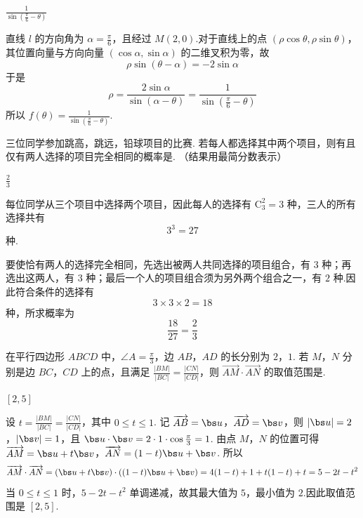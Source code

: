 \begin{answer}
\(\frac{1}{\sin\left(\frac{\pi}{6}-\theta\right)}\)
\end{answer}

\begin{solution}
直线 \(l\) 的方向角为 \(\alpha=\frac{\pi}{6}\)，且经过 \(M(2,0)\).对于直线上的点 \((\rho\cos\theta,\rho\sin\theta)\)，其位置向量与方向向量 \((\cos\alpha,\sin\alpha)\) 的二维叉积为零，故
\[
\rho\sin(\theta-\alpha)=-2\sin\alpha
\]
于是
\[
\rho=\frac{2\sin\alpha}{\sin(\alpha-\theta)}
=\frac{1}{\sin\left(\frac{\pi}{6}-\theta\right)}
\]
所以 \(f(\theta)=\frac{1}{\sin\left(\frac{\pi}{6}-\theta\right)}\).
\end{solution}

\begin{problem}
三位同学参加跳高，跳远，铅球项目的比赛. 若每人都选择其中两个项目，则有且仅有两人选择的项目完全相同的概率是\fillinblank{}. （结果用最简分数表示）
\end{problem}

\begin{answer}
\(\frac{2}{3}\)
\end{answer}

\begin{solution}
每位同学从三个项目中选择两个项目，因此每人的选择有 \(\mathrm C_3^2=3\) 种，三人的所有选择共有
\[
3^3=27
\]
种.

要使恰有两人的选择完全相同，先选出被两人共同选择的项目组合，有 \(3\) 种；再选出这两人，有 \(3\) 种；最后一个人的项目组合须为另外两个组合之一，有 \(2\) 种.因此符合条件的选择有
\[
3\times3\times2=18
\]
种，所求概率为
\[
\frac{18}{27}=\frac23
\]
\end{solution}

\begin{problem}
在平行四边形 \(ABCD\) 中，\(\angle A = \frac{\pi}{3}\)，边 \(AB\)，\(AD\) 的长分别为 \(2\)，\(1\). 若 \(M\)，\(N\) 分别是边 \(BC\)，\(CD\) 上的点，且满足 \(\frac{|BM|}{|BC|} = \frac{|CN|}{|CD|}\)，则 \(\overrightarrow{AM} \cdot \overrightarrow{AN}\) 的取值范围是\fillinblank{}.
\end{problem}

\begin{answer}
\([2,5]\)
\end{answer}

\begin{solution}
设 \(t=\frac{|BM|}{|BC|}=\frac{|CN|}{|CD|}\)，其中 \(0\leqslant t\leqslant1\).
记 \(\overrightarrow{AB}=\bs u\)，\(\overrightarrow{AD}=\bs v\)，则
 \(|\bs u|=2\)，\(|\bs v|=1\)，且 \(\bs u\cdot\bs v=2\cdot1\cdot\cos\frac{\pi}{3}=1\).
由点 \(M\)，\(N\) 的位置可得
 \(\overrightarrow{AM}=\bs u+t\bs v\)，\(\overrightarrow{AN}=(1-t)\bs u+\bs v\).
所以
\[
\overrightarrow{AM}\cdot\overrightarrow{AN}
=(\bs u+t\bs v)\cdot((1-t)\bs u+\bs v)
=4(1-t)+1+t(1-t)+t
=5-2t-t^2
\]
当 \(0\leqslant t\leqslant1\) 时，\(5-2t-t^2\) 单调递减，故其最大值为 \(5\)，最小值为 \(2\).因此取值范围是 \([2,5]\).
\end{solution}

